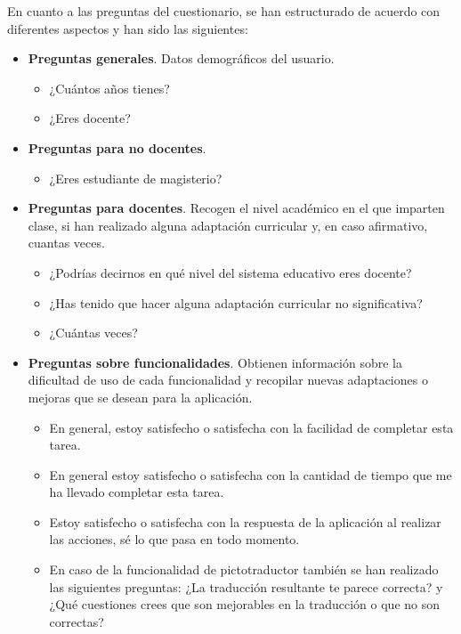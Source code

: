 En cuanto a las preguntas del cuestionario, se han estructurado de acuerdo con diferentes aspectos y han sido las siguientes:

\begin{itemize}
    \item \textbf{Preguntas generales}. Datos demográficos del usuario.
          \begin{itemize}
              \item ¿Cuántos años tienes?
              \item ¿Eres docente?
          \end{itemize}
    \item \textbf{Preguntas para no docentes}.
          \begin{itemize}
              \item ¿Eres estudiante de magisterio?
          \end{itemize}
    \item \textbf{Preguntas para docentes}. Recogen el nivel académico en el que imparten clase, si han realizado alguna adaptación curricular y, en caso afirmativo, cuantas veces.
          \begin{itemize}
              \item ¿Podrías decirnos en qué nivel del sistema educativo eres docente?
              \item ¿Has tenido que hacer alguna adaptación curricular no significativa?
              \item ¿Cuántas veces?
          \end{itemize}
    \item \textbf{Preguntas sobre funcionalidades}. Obtienen información sobre la
          dificultad de uso de cada funcionalidad y recopilar nuevas adaptaciones
          o mejoras que se desean para la aplicación.
          \begin{itemize}
              \item En general, estoy  satisfecho o satisfecha con la facilidad de completar esta tarea.
              \item En general estoy  satisfecho o satisfecha con la cantidad de tiempo que me ha llevado completar esta tarea.
              \item Estoy  satisfecho o satisfecha con la respuesta de la aplicación al realizar las acciones, sé lo que pasa en todo momento.
              \item En caso de la funcionalidad de pictotraductor también se han realizado las siguientes preguntas: ¿La traducción resultante te parece correcta? y ¿Qué cuestiones crees que son mejorables en la traducción o que no son correctas?

\end{itemize}
\end{itemize}
